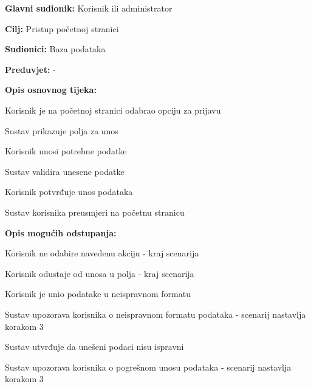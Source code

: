 					\noindent {}
					\begin{packed_item}
	
						\item \textbf{Glavni sudionik: }Korisnik ili administrator
						\item  \textbf{Cilj:} Pristup početnoj stranici
						\item  \textbf{Sudionici:} Baza podataka
						\item  \textbf{Preduvjet:} -
						
						\eject

						\item  \textbf{Opis osnovnog tijeka:}
						
						\item[] \begin{packed_enum}
							\item Korisnik je na početnoj stranici odabrao opciju za prijavu
							\item Sustav prikazuje polja za unos
							\item Korisnik unosi potrebne podatke
							\item Sustav validira unesene podatke
							\item Korisnik potvrđuje unos podataka
							\item Sustav korisnika preusmjeri na početnu stranicu
						\end{packed_enum}

						\item  \textbf{Opis mogućih odstupanja:}

						\item[] \begin{packed_item}
							\item[1.a] Korisnik ne odabire navedenu akciju - kraj scenarija
							\item[3.a] Korisnik odustaje od unosa u polja - kraj scenarija
							\item[4.a] Korisnik je unio podatake u neispravnom formatu
							\item[] \begin{packed_enum}
								\item Sustav upozorava korisnika o neispravnom formatu podataka - scenarij nastavlja korakom 3
							\end{packed_enum}	
							\item[6.a] Sustav utvrđuje da unešeni podaci nisu ispravni
							\item[] \begin{packed_enum}
								\item Sustav upozorava korisnika o pogrešnom unosu podataka - scenarij nastavlja korakom 3 
							\end{packed_enum}					
						\end{packed_item}
					\end{packed_item}

